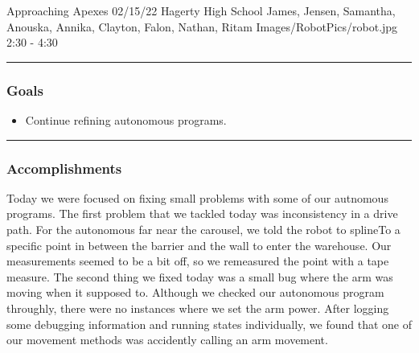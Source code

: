 \insertmeeting 
	{Approaching Apexes} 
	{02/15/22} 
	{Hagerty High School}
	{James, Jensen, Samantha, Anouska, Annika, Clayton, Falon, Nathan, Ritam}
	{Images/RobotPics/robot.jpg}
	{2:30 - 4:30}
	
\noindent\hfil\rule{\textwidth}{.4pt}\hfil
\subsubsection*{Goals}
\begin{itemize}
    \item Continue refining autonomous programs. 

\end{itemize} 

\noindent\hfil\rule{\textwidth}{.4pt}\hfil

\subsubsection*{Accomplishments}
Today we were focused on fixing small problems with some of our autnomous programs. The first problem that we tackled today was inconsistency in a drive path. For the autonomous far near the carousel, we told the robot to splineTo a specific point in between the barrier and the wall to enter the warehouse. Our measurements seemed to be a bit off, so we remeasured the point with a tape measure.
The second thing we fixed today was a small bug where the arm was moving when it supposed to. Although we checked our autonomous program throughly, there were no instances where we set the arm power. After logging some debugging information and running states individually, we found that one of our movement methods was accidently calling an arm movement. 



